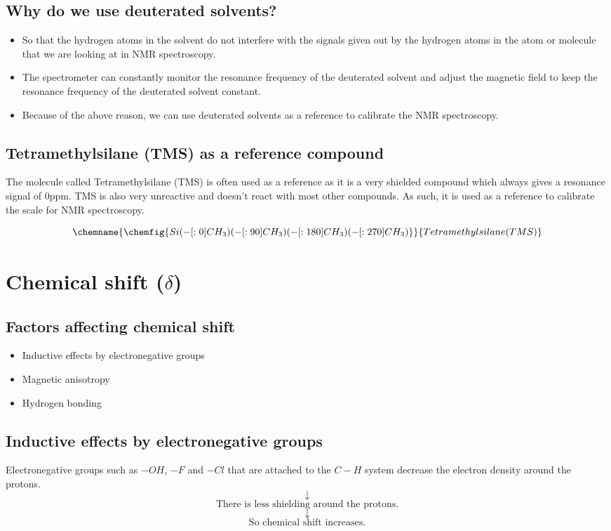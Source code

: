\documentclass[11pt]{article}
\begin{document}
\subsection{Why do we use deuterated solvents?}
\label{sec:orgcaf71ca}
\begin{itemize}
\item So that the hydrogen atoms in the solvent do not interfere with the signals given out by the hydrogen atoms in the atom or molecule that we are looking at in NMR spectroscopy.
\item The spectrometer can constantly monitor the resonance frequency of the deuterated solvent and adjust the magnetic field to keep the resonance frequency of the deuterated solvent constant.
\item Because of the above reason, we can use deuterated solvents as a reference to calibrate the NMR spectroscopy.
\end{itemize}

\subsection{Tetramethylsilane (TMS) as a reference compound}
\label{sec:org24297b5}
The molecule called Tetramethylsilane (TMS) is often used as a reference as it is a very shielded compound which always gives a resonance signal of 0ppm. TMS is also very unreactive and doesn't react with most other compounds. As such, it is used as a reference to calibrate the scale for NMR spectroscopy.

\[
\chemname{
\chemfig{Si(-[:0]CH_3)(-[:90]CH_3)(-[:180]CH_3)(-[:270]CH_3)}
}{Tetramethylsilane (TMS)}
\]


\section{Chemical shift (\(\delta\))}
\label{sec:org6015cfd}

\subsection{Factors affecting chemical shift}
\label{sec:org2b131ac}
\begin{itemize}
\item Inductive effects by electronegative groups
\item Magnetic anisotropy
\item Hydrogen bonding
\end{itemize}

\subsection{Inductive effects by electronegative groups}
\label{sec:orgb01d41b}
Electronegative groups such as \(-OH\), \(-F\) and \(-Cl\) that are attached to the \(C-H\) system decrease the electron density around the protons.
\[\downarrow\]
\[\text{There is less shielding around the protons.}\]
\[\downarrow\]
\[\text{So chemical shift increases.}\]
\end{document}
